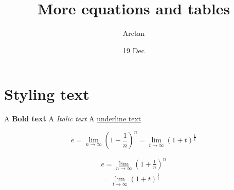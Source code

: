\documentclass{article}
\title{More equations and tables}
\author{Arctan}
\date{19 Dec}
\begin{document}
\maketitle

\section{Styling text}

A \textbf{Bold text}
A \textit{Italic text}
A \underline{underline text}

    \begin{equation}
        e = \lim_{n\to\infty}\left(1+\frac{1}{n}\right)^n
          = \lim_{t\to\infty}(1+t)^\frac{1}{t}
    \end{equation}

    \begin{align}
        e = \lim_{n\to\infty}\left(1+\frac{1}{n}\right)^n \\ 
          = \lim_{t\to\infty}(1+t)^\frac{1}{t}
    \end{align}
\end{document}
